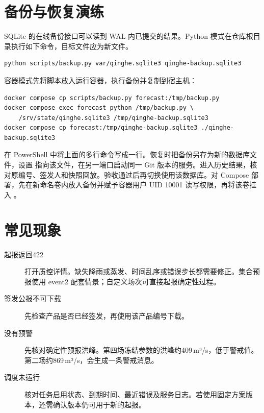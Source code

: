 \section{备份与恢复演练}
SQLite 的在线备份接口可以读到 WAL 内已提交的结果。Python 模式在仓库根目录执行如下命令，目标文件应为新文件。
\begin{verbatim}
python scripts/backup.py var/qinghe.sqlite3 qinghe-backup.sqlite3
\end{verbatim}
容器模式先将脚本放入运行容器，执行备份并复制到宿主机：
\begin{verbatim}
docker compose cp scripts/backup.py forecast:/tmp/backup.py
docker compose exec forecast python /tmp/backup.py \
    /srv/state/qinghe.sqlite3 /tmp/qinghe-backup.sqlite3
docker compose cp forecast:/tmp/qinghe-backup.sqlite3 ./qinghe-backup.sqlite3
\end{verbatim}
在 PowerShell 中将上面的多行命令写成一行。恢复时把备份另存为新的数据库文件，设置  指向该文件，在另一端口启动同一 Git 版本的服务。进入历史结果，核对原编号、签发人和快照回放。验收通过后再切换使用该数据库。对 Compose 部署，先在新命名卷内放入备份并赋予容器用户 UID 10001 读写权限，再将该卷挂入 。
\section{常见现象}
\begin{description}
\item[起报返回422] 打开质控详情。缺失降雨或蒸发、时间乱序或错误步长都需要修正。集合预报使用 event2 配套情景；自定义场次可直接起报确定性过程。
\item[签发公报不可下载] 先检查产品是否已经签发，再使用该产品编号下载。
\item[没有预警] 先核对确定性预报洪峰。第四场冻结参数的洪峰约409\,m³/s，低于警戒值。第二场约869\,m³/s，会生成一条警戒消息。
\item[调度未运行] 核对任务启用状态、到期时间、最近错误及服务日志。若使用固定方案版本，还需确认版本仍可用于新的起报。
\end{description}

